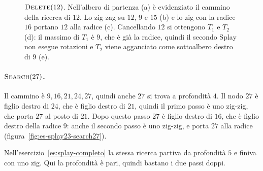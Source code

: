 \begin{figure}[htbp]
\caption{$\textsc{Delete}(12)$. Nell'albero di partenza (a) è evidenziato il cammino della ricerca di $12$. Lo zig-zag su $12$, $9$ e $15$ (b) e lo zig con la radice $16$ portano $12$ alla radice (c). Cancellando $12$ si ottengono $T_1$ e $T_2$ (d): il massimo di $T_1$ è $9$, che è già la radice, quindi il secondo Splay non esegue rotazioni e $T_2$ viene agganciato come sottoalbero destro di $9$ (e).}
\label{fig:es-splay23-delete12}
\end{figure}

\paragraph{$\textsc{Search}(27)$.}
Il cammino è $9, 16, 21, 24, 27$, quindi anche $27$ si trova a profondità $4$. Il nodo $27$ è figlio destro di $24$, che è figlio destro di $21$, quindi il primo passo è uno zig-zig, che porta $27$ al posto di $21$. Dopo questo passo $27$ è figlio destro di $16$, che è figlio destro della radice $9$: anche il secondo passo è uno zig-zig, e porta $27$ alla radice (figura~\ref{fig:es-splay23-search27}).

Nell'esercizio~\ref{es:splay-completo} la stessa ricerca partiva da profondità $5$ e finiva con uno zig. Qui la profondità è pari, quindi bastano i due passi doppi.

